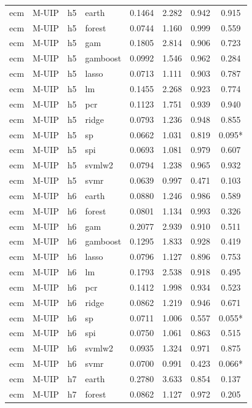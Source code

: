 \begin{ThreePartTable}
\begin{longtable}[t]{llclcccc}
\addlinespace
ecm & M-UIP & h5 & earth & 0.1464 & 2.282 & 0.942 & 0.915\\
ecm & M-UIP & h5 & forest & 0.0744 & 1.160 & 0.999 & 0.559\\
ecm & M-UIP & h5 & gam & 0.1805 & 2.814 & 0.906 & 0.723\\
ecm & M-UIP & h5 & gamboost & 0.0992 & 1.546 & 0.962 & 0.284\\
ecm & M-UIP & h5 & lasso & 0.0713 & 1.111 & 0.903 & 0.787\\
ecm & M-UIP & h5 & lm & 0.1455 & 2.268 & 0.923 & 0.774\\
ecm & M-UIP & h5 & pcr & 0.1123 & 1.751 & 0.939 & 0.940\\
ecm & M-UIP & h5 & ridge & 0.0793 & 1.236 & 0.948 & 0.855\\
ecm & M-UIP & h5 & sp & 0.0662 & 1.031 & 0.819 & 0.095*\\
ecm & M-UIP & h5 & spi & 0.0693 & 1.081 & 0.979 & 0.607\\
ecm & M-UIP & h5 & svmlw2 & 0.0794 & 1.238 & 0.965 & 0.932\\
ecm & M-UIP & h5 & svmr & 0.0639 & 0.997 & 0.471 & 0.103\\
\addlinespace
ecm & M-UIP & h6 & earth & 0.0880 & 1.246 & 0.986 & 0.589\\
ecm & M-UIP & h6 & forest & 0.0801 & 1.134 & 0.993 & 0.326\\
ecm & M-UIP & h6 & gam & 0.2077 & 2.939 & 0.910 & 0.511\\
ecm & M-UIP & h6 & gamboost & 0.1295 & 1.833 & 0.928 & 0.419\\
ecm & M-UIP & h6 & lasso & 0.0796 & 1.127 & 0.896 & 0.753\\
ecm & M-UIP & h6 & lm & 0.1793 & 2.538 & 0.918 & 0.495\\
ecm & M-UIP & h6 & pcr & 0.1412 & 1.998 & 0.934 & 0.523\\
ecm & M-UIP & h6 & ridge & 0.0862 & 1.219 & 0.946 & 0.671\\
ecm & M-UIP & h6 & sp & 0.0711 & 1.006 & 0.557 & 0.055*\\
ecm & M-UIP & h6 & spi & 0.0750 & 1.061 & 0.863 & 0.515\\
ecm & M-UIP & h6 & svmlw2 & 0.0935 & 1.324 & 0.971 & 0.875\\
ecm & M-UIP & h6 & svmr & 0.0700 & 0.991 & 0.423 & 0.066*\\
\addlinespace
ecm & M-UIP & h7 & earth & 0.2780 & 3.633 & 0.854 & 0.137\\
ecm & M-UIP & h7 & forest & 0.0862 & 1.127 & 0.972 & 0.205\\

\end{longtable}
\end{ThreePartTable}
